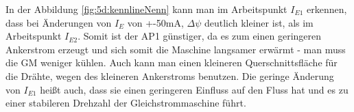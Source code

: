 In der Abbildung \ref{fig:5d:kennlineNenn} kann man im Arbeitspunkt $ I_{E1} $ erkennen, dass bei Änderungen von $ I_{E} $ von +-50mA, $ \Delta\psi $ deutlich kleiner ist, als im Arbeitspunkt $ I_{E2} $. Somit ist der AP1 günstiger, da es zum einen geringeren Ankerstrom erzeugt und sich somit die Maschine langsamer erwärmt - man muss die GM weniger kühlen. Auch kann man einen kleineren Querschnittsfläche für die Drähte, wegen des kleineren Ankerstroms benutzen. Die geringe Änderung von $ I_{E1} $ heißt auch, dass sie einen geringeren Einfluss auf den Fluss hat und es zu einer stabileren Drehzahl der Gleichstrommaschine führt.